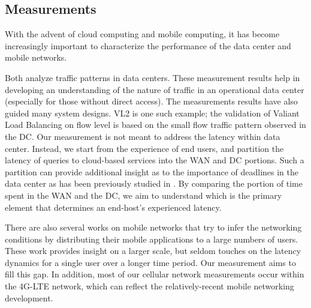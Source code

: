 \subsection{Measurements}
\label{sec:measurements}

With the advent of cloud computing and mobile computing, it has become increasingly important to characterize the performance of the data center and mobile networks. 

Both \cite{benson2010network, kandula2009nature} analyze traffic patterns in data centers. These measurement results help in developing an understanding of the nature of traffic in an operational data center (especially for those without direct access). The measurements results have also guided many system designs. VL2 \cite{greenberg2009vl2} is one such example; the validation of Valiant Load Balancing on flow level is based on the small flow traffic pattern observed in the DC. Our measurement is not meant to address the latency within data center. Instead, we start from the experience of end users, and partition the latency of queries to cloud-based services into the WAN and DC portions. Such a partition can provide additional insight as to the importance of deadlines in the data center as has been previously studied in \cite{wilson2011better}. By comparing the portion of time spent in the WAN and the DC, we aim to understand which is the primary element that determines an end-host's experienced latency.

There are also several works on mobile networks \cite{xu2011cellular, huang2011mobiperf} that try to infer the networking conditions by distributing their mobile applications to a large numbers of users. These work provides insight on a larger scale, but seldom touches on the latency dynamics for a single user over a longer time period. Our measurement aims to fill this gap. In addition, most of our cellular network measurements occur within the 4G-LTE network, which can reflect the relatively-recent mobile networking development.



